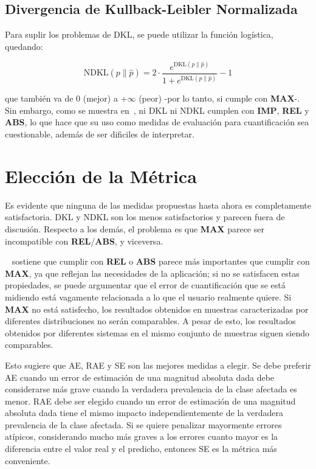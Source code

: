 \subsection{Divergencia de Kullback-Leibler Normalizada}

Para suplir los problemas de DKL, se puede utilizar la función logística,
quedando:

\begin{equation}
    {\text{NDKL}}(p\parallel \hat{p}) = 2 \cdot \frac{e^{{\text{DKL}}(p\parallel \hat{p})}}{1+e^{{\text{DKL}}(p\parallel \hat{p})}}-1
\end{equation}

que también va de {0} (mejor) a {+$\infty$} (peor) -por lo tanto, si cumple con
{\bf MAX}-. Sin embargo, como se muestra en~\cite{sebastiani2020evaluation}, ni
DKL ni NDKL cumplen con {\bf IMP}, {\bf REL} y {\bf ABS}, lo que hace que su uso
como medidas de evaluación para cuantificación sea cuestionable, además de ser
dificiles de interpretar.

\section{Elección de la Métrica}

Es evidente que ninguna de las medidas propuestas hasta ahora es completamente
satisfactoria. DKL y NDKL son los menos satisfactorios y parecen fuera de
discusión. Respecto a los demás, el problema es que {\bf MAX} parece ser
incompatible con {\bf REL}/{\bf ABS}, y viceversa.

~\citet{sebastiani2020evaluation} sostiene que cumplir con {\bf REL} o {\bf ABS}
parece más importantes que cumplir con {\bf MAX}, ya que reflejan las
necesidades de la aplicación; si no se satisfacen estas propiedades, se puede
argumentar que el error de cuantificación que se está midiendo está vagamente
relacionada a lo que el usuario realmente quiere. Si {\bf MAX} no está
satisfecho, los resultados obtenidos en muestras caracterizadas por diferentes
distribuciones no serán comparables. A pesar de esto, los resultados obtenidos
por diferentes sistemas en el mismo conjunto de muestras siguen siendo
comparables.

Esto sugiere que AE, RAE y SE son las mejores medidas a elegir. Se debe preferir
AE cuando un error de estimación de una magnitud absoluta dada debe considerarse
más grave cuando la verdadera prevalencia de la clase afectada es menor. RAE
debe ser elegido cuando un error de estimación de una magnitud absoluta dada
tiene el mismo impacto independientemente de la verdadera prevalencia de la
clase afectada. Si se quiere penalizar mayormente errores atípicos, considerando
mucho más graves a los errores cuanto mayor es la diferencia entre el valor real
y el predicho, entonces SE es la métrica más conveniente.

